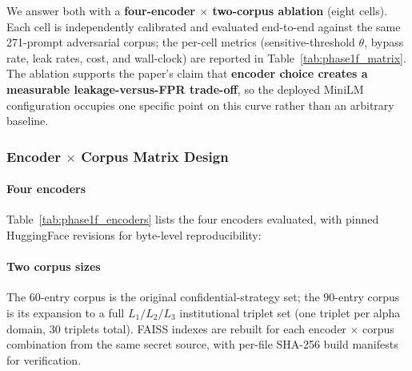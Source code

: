 \documentclass[journal]{IEEEtran}
\begin{document}
We answer both with a \textbf{four-encoder $\times$ two-corpus ablation} (eight cells). Each cell is independently calibrated and evaluated end-to-end against the same 271-prompt adversarial corpus; the per-cell metrics (sensitive-threshold $\theta$, bypass rate, leak rates, cost, and wall-clock) are reported in Table~\ref{tab:phase1f_matrix}. The ablation supports the paper's claim that \textbf{encoder choice creates a measurable leakage-versus-FPR trade-off}, so the deployed MiniLM configuration occupies one specific point on this curve rather than an arbitrary baseline.

\subsubsection{Encoder $\times$ Corpus Matrix Design}
\label{Sect:V_A_2_Matrix_Design}

\paragraph{Four encoders}
Table~\ref{tab:phase1f_encoders} lists the four encoders evaluated, with pinned HuggingFace revisions for byte-level reproducibility:

\begin{table}[!t]
    \centering
    \caption{Encoders evaluated in the encoder ablation.}
    \label{tab:phase1f_encoders}
\end{table}

\paragraph{Two corpus sizes}
The 60-entry corpus is the original confidential-strategy set; the 90-entry corpus is its expansion to a full $L_1/L_2/L_3$ institutional triplet set (one triplet per alpha domain, 30 triplets total). FAISS indexes are rebuilt for each encoder $\times$ corpus combination from the same secret source, with per-file SHA-256 build manifests for verification.
\end{document}
